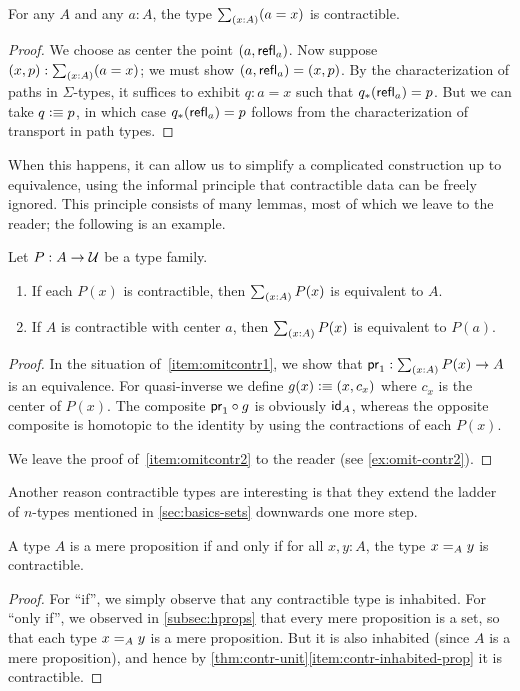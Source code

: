 \begin{lem}\label{thm:contr-paths}
  For any $A$ and any $a:A$, the type $\sm{x:A} (a=x)$ is contractible.
\end{lem}
\begin{proof}
  We choose as center the point $(a,\refl a)$.
  Now suppose $(x,p):\sm{x:A}(a=x)$; we must show $(a,\refl a) = (x,p)$.
  By the characterization of paths in $\Sigma$-types, it suffices to exhibit $q:a=x$ such that $\trans{q}{\refl a} = p$.
  But we can take $q\defeq p$, in which case $\trans{q}{\refl a} = p$ follows from the characterization of transport in path types.
\end{proof}

When this happens, it can allow us to simplify a complicated construction up to equivalence, using the informal principle that contractible data can be freely ignored.
This principle consists of many lemmas, most of which we leave to the reader; the following is an example.

\begin{lem}\label{thm:omit-contr}
  Let $P:A\to\type$ be a type family.
  \begin{enumerate}
  \item If each $P(x)$ is contractible, then $\sm{x:A} P(x)$ is equivalent to $A$.\label{item:omitcontr1}
  \item If $A$ is contractible with center $a$, then $\sm{x:A} P(x)$ is equivalent to $P(a)$.\label{item:omitcontr2}
  \end{enumerate}
\end{lem}
\begin{proof}
  In the situation of~\ref{item:omitcontr1}, we show that $\proj1:\sm{x:A} P(x) \to A$ is an equivalence.
  For quasi-inverse we define $g(x)\defeq (x,c_x)$ where $c_x$ is the center of $P(x)$.
  The composite $\proj1 \circ g$ is obviously $\idfunc[A]$, whereas the opposite composite is homotopic to the identity by using the contractions of each $P(x)$.

  We leave the proof of~\ref{item:omitcontr2} to the reader (see \autoref{ex:omit-contr2}).
\end{proof}

Another reason contractible types are interesting is that they extend the ladder of $n$-types mentioned in \autoref{sec:basics-sets} downwards one more step.

\begin{lem}\label{thm:prop-minusonetype}
  A type $A$ is a mere proposition if and only if for all $x,y:A$, the type $\id[A]xy$ is contractible.
\end{lem}
\begin{proof}
  For ``if'', we simply observe that any contractible type is inhabited.
  For ``only if'', we observed in \autoref{subsec:hprops} that every mere proposition is a set, so that each type $\id[A]xy$ is a mere proposition.
  But it is also inhabited (since $A$ is a mere proposition), and hence by \autoref{thm:contr-unit}\ref{item:contr-inhabited-prop} it is contractible.
\end{proof}

